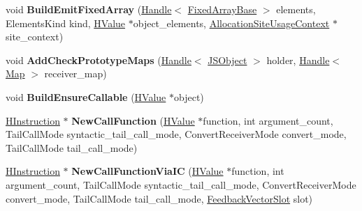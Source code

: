 \begin{DoxyCompactItemize}
\item 
void {\bfseries Build\+Emit\+Fixed\+Array} (\hyperlink{classv8_1_1internal_1_1_handle}{Handle}$<$ \hyperlink{classv8_1_1internal_1_1_fixed_array_base}{Fixed\+Array\+Base} $>$ elements, Elements\+Kind kind, \hyperlink{classv8_1_1internal_1_1_h_value}{H\+Value} $\ast$object\+\_\+elements, \hyperlink{classv8_1_1internal_1_1_allocation_site_usage_context}{Allocation\+Site\+Usage\+Context} $\ast$site\+\_\+context)\hypertarget{classv8_1_1internal_1_1_h_optimized_graph_builder_a28ee139e63460e8ff61e0d2e0128c955}{}\label{classv8_1_1internal_1_1_h_optimized_graph_builder_a28ee139e63460e8ff61e0d2e0128c955}

\item 
void {\bfseries Add\+Check\+Prototype\+Maps} (\hyperlink{classv8_1_1internal_1_1_handle}{Handle}$<$ \hyperlink{classv8_1_1internal_1_1_j_s_object}{J\+S\+Object} $>$ holder, \hyperlink{classv8_1_1internal_1_1_handle}{Handle}$<$ \hyperlink{classv8_1_1internal_1_1_map}{Map} $>$ receiver\+\_\+map)\hypertarget{classv8_1_1internal_1_1_h_optimized_graph_builder_afb43996366d6ddd37163ef682fd36d65}{}\label{classv8_1_1internal_1_1_h_optimized_graph_builder_afb43996366d6ddd37163ef682fd36d65}

\item 
void {\bfseries Build\+Ensure\+Callable} (\hyperlink{classv8_1_1internal_1_1_h_value}{H\+Value} $\ast$object)\hypertarget{classv8_1_1internal_1_1_h_optimized_graph_builder_a97d273eeaa0eb1dba35737ad71ab8b03}{}\label{classv8_1_1internal_1_1_h_optimized_graph_builder_a97d273eeaa0eb1dba35737ad71ab8b03}

\item 
\hyperlink{classv8_1_1internal_1_1_h_instruction}{H\+Instruction} $\ast$ {\bfseries New\+Call\+Function} (\hyperlink{classv8_1_1internal_1_1_h_value}{H\+Value} $\ast$function, int argument\+\_\+count, Tail\+Call\+Mode syntactic\+\_\+tail\+\_\+call\+\_\+mode, Convert\+Receiver\+Mode convert\+\_\+mode, Tail\+Call\+Mode tail\+\_\+call\+\_\+mode)\hypertarget{classv8_1_1internal_1_1_h_optimized_graph_builder_a43d536c0a753bbff02a46bc31a0bfdeb}{}\label{classv8_1_1internal_1_1_h_optimized_graph_builder_a43d536c0a753bbff02a46bc31a0bfdeb}

\item 
\hyperlink{classv8_1_1internal_1_1_h_instruction}{H\+Instruction} $\ast$ {\bfseries New\+Call\+Function\+Via\+IC} (\hyperlink{classv8_1_1internal_1_1_h_value}{H\+Value} $\ast$function, int argument\+\_\+count, Tail\+Call\+Mode syntactic\+\_\+tail\+\_\+call\+\_\+mode, Convert\+Receiver\+Mode convert\+\_\+mode, Tail\+Call\+Mode tail\+\_\+call\+\_\+mode, \hyperlink{classv8_1_1internal_1_1_feedback_vector_slot}{Feedback\+Vector\+Slot} slot)\hypertarget{classv8_1_1internal_1_1_h_optimized_graph_builder_a32127063c181a12bf41a842c9f5dc272}{}\label{classv8_1_1internal_1_1_h_optimized_graph_builder_a32127063c181a12bf41a842c9f5dc272}


\end{DoxyCompactItemize}

